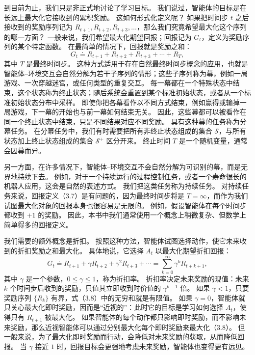 \documentclass[UTF8, 12pt, fontset=fandol, oneside]{ctexart}
\begin{document}
到目前为止，我们只是非正式地讨论了学习目标。
我们说过，智能体的目标是在长远上最大化它接收到的累积奖励。
这如何形式化定义呢？
如果把时间步 $t$ 之后接收到的奖励序列记为 $R_{t+1},R_{t+2},R_{t+3},\ldots$，那么我们究竟希望最大化这个序列的哪一方面？
一般来说，我们希望最大化期望回报；回报记为 $G_t$，定义为奖励序列的某个特定函数。
在最简单的情况下，回报就是奖励之和：
\begin{equation}
G_t\doteq R_{t+1}+R_{t+2}+R_{t+3}+\cdots+R_T,
\tag{3.7}
\end{equation}
其中 $T$ 是最终时间步。
这种方式适用于存在自然最终时间步概念的应用，也就是智能体--环境交互会自然分解为若干子序列的情形；这些子序列称为幕，例如一局游戏、一次穿越迷宫，或任何类型的重复交互。
每一幕都在一个特殊状态中结束，这个状态称为终止状态；随后系统会重置到某个标准初始状态，或者从一个标准初始状态分布中采样。
即使你把各幕看作以不同方式结束，例如赢得或输掉一局游戏，下一幕的开始也与前一幕如何结束无关。
因此，这些幕都可以被看作在同一个终止状态中结束，只是不同结果对应不同奖励。
具有这种幕的任务称为分幕任务。
在分幕任务中，我们有时需要把所有非终止状态组成的集合 $\mathcal{S}$，与所有状态加上终止状态组成的集合 $\mathcal{S}^+$ 区分开来。
终止时间 $T$ 是一个随机变量，通常会因幕而异。

另一方面，在许多情况下，智能体--环境交互不会自然分解为可识别的幕，而是无界地持续下去。
例如，对于一个持续运行的过程控制任务，或者一个寿命很长的机器人应用，这会是自然的表述方式。
我们把这类任务称为持续任务。
对持续任务来说，回报定义（3.7）是有问题的，因为最终时间步将是 $T=\infty$，而作为我们试图最大化对象的回报本身也很容易是无限的。
例如，假设智能体在每个时间步都收到 $+1$ 的奖励。
因此，本书中我们通常使用一个概念上稍微复杂、但数学上简单得多的回报定义。

我们需要的额外概念是折扣。
按照这种方法，智能体试图选择动作，使它未来收到的折扣奖励之和最大化。
具体地说，它选择 $A_t$ 以最大化期望折扣回报：
\begin{equation}
G_t\doteq R_{t+1}+\gamma R_{t+2}+\gamma^2R_{t+3}+\cdots
=\sum_{k=0}^{\infty}\gamma^kR_{t+k+1},
\tag{3.8}
\end{equation}
其中 $\gamma$ 是一个参数，$0\leq\gamma\leq1$，称为折扣率。
折扣率决定未来奖励的现值：未来 $k$ 个时间步后收到的奖励，只值其立即收到时价值的 $\gamma^{k-1}$ 倍。
如果 $\gamma<1$，只要奖励序列 $\{R_k\}$ 有界，式（3.8）中的无穷和就是有限值。
如果 $\gamma=0$，智能体就只关心最大化即时奖励，因而是“近视的”：此时它的目标是学习如何选择 $A_t$，使得只有 $R_{t+1}$ 被最大化。
如果智能体的每个动作都只影响即时奖励，而不影响未来奖励，那么近视智能体可以通过分别最大化每个即时奖励来最大化（3.8）。
但一般来说，为了最大化即时奖励而行动，会降低对未来奖励的获取，从而降低回报。
当 $\gamma$ 接近 $1$ 时，回报目标会更强地考虑未来奖励，智能体也变得更有远见。
\end{document}
